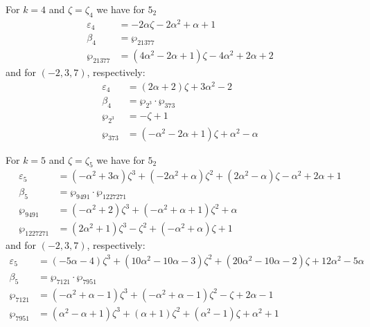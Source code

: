 \documentclass[12pt]{amsart}
\theoremstyle{definition}
\def\a{\alpha}
\def\z{\zeta}
\def\z{\zeta}
\begin{document}
\noindent 
For $k=4$ and $\zeta=\zeta_4$ we have for $5_2$
{\small
\begin{align*}
\varepsilon_{4} &= -2 \a \z - 2 \a^2 + \a + 1
\\
\beta_{4} &= \wp_{21377}  \\
\wp_{21377} &= (4 \a^2 - 2 \a + 1) \z - 4 \a^2 + 2 \a + 2
\end{align*}
}
and for $(-2,3,7)$, respectively:
{\small
\begin{align*}
\varepsilon_{4} &= (2 \a + 2) \z + 3 \a^2 - 2
\\
\beta_{4} &= \wp_{2^3} \cdot \wp_{373}  \\
\wp_{2^3} &= -\z + 1
\\
\wp_{373} &= (-\a^2 - 2 \a + 1) \z + \a^2 - \a
\end{align*}
}

\noindent 
For $k=5$ and $\zeta=\zeta_5$ we have for $5_2$
{\small
\begin{align*}
\varepsilon_{5} &= 
(-\a^2 + 3 \a) \z^3 + (-2 \a^2 + \a) \z^2 + (2 \a^2 - \a) \z - \a^2 + 2 \a + 1
\\
\beta_{5} &= \wp_{9491} \cdot \wp_{1227271} \\
\wp_{9491} &= (-\a^2 + 2) \z^3 + (-\a^2 + \a + 1) \z^2 + \a
\\
\wp_{1227271} &= (2 \a^2 + 1) \z^3 - \z^2 + (-\a^2 + \a) \z + 1
\end{align*}
}
and for $(-2,3,7)$, respectively:
{\small
\begin{align*}
\varepsilon_{5} &= 
(-5 \a - 4) \z^3 + (10 \a^2 - 10 \a - 3) \z^2 + (20 \a^2 - 10 \a - 2) \z 
+ 12 \a^2 - 5 \a
\\
\beta_{5} &= \wp_{7121} \cdot \wp_{7951} \\
\wp_{7121} &=(-\a^2 + \a - 1) \z^3 + (-\a^2 + \a - 1) \z^2 - \z + 2 \a - 1
\\
\wp_{7951} &=(\a^2 - \a + 1) \z^3 + (\a + 1) \z^2 + (\a^2 - 1) \z + \a^2 + 1
\end{align*}
}
\end{document}
